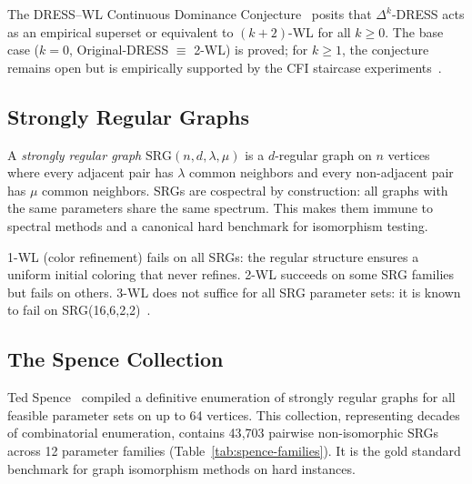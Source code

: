 \documentclass[11pt,a4paper]{article}
\begin{document}
The DRESS--WL Continuous Dominance Conjecture~\cite{castrillo2026dress} posits that $\Delta^k$-DRESS acts as an empirical superset or equivalent to $(k{+}2)$-WL for all $k \geq 0$.
The base case ($k = 0$, Original-DRESS $\equiv$ 2-WL) is proved; for $k \geq 1$, the conjecture remains open but is empirically supported by the CFI staircase experiments~\cite{castrillo2026dress}.


\subsection{Strongly Regular Graphs}

A \emph{strongly regular graph} $\text{SRG}(n, d, \lambda, \mu)$ is a $d$-regular graph on $n$ vertices where every adjacent pair has $\lambda$ common neighbors and every non-adjacent pair has $\mu$ common neighbors.
SRGs are cospectral by construction: all graphs with the same parameters share the same spectrum.
This makes them immune to spectral methods and a canonical hard benchmark for isomorphism testing.

1-WL (color refinement) fails on all SRGs: the regular structure ensures a uniform initial coloring that never refines.
2-WL succeeds on some SRG families but fails on others.
3-WL does not suffice for all SRG parameter sets: it is known to fail on SRG(16,6,2,2)~\cite{cai1992optimal}.


\subsection{The Spence Collection}

Ted Spence~\cite{spence2024srg} compiled a definitive enumeration of strongly regular graphs for all feasible parameter sets on up to 64 vertices.
This collection, representing decades of combinatorial enumeration, contains 43{,}703 pairwise non-isomorphic SRGs across 12 parameter families (Table~\ref{tab:spence-families}).
It is the gold standard benchmark for graph isomorphism methods on hard instances.
\end{document}
